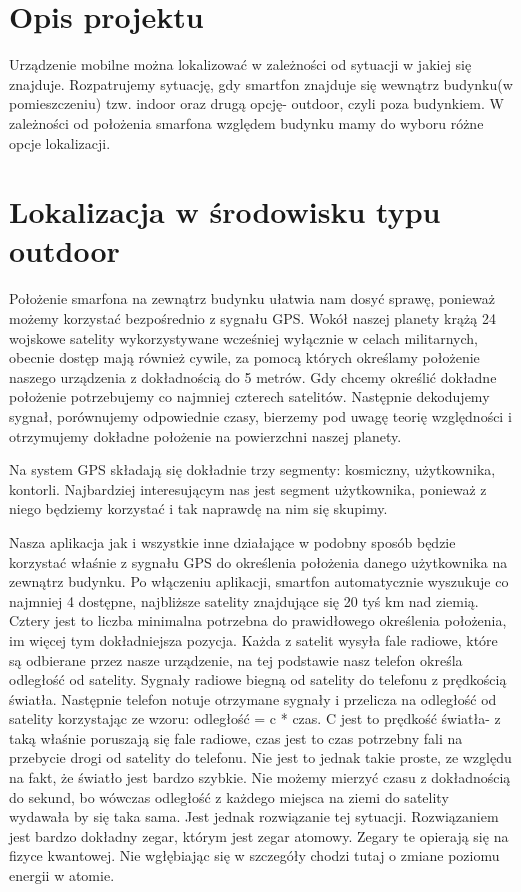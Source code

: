 \documentclass[11pt]{article}
\begin{document}
	\tableofcontents
	\cleardoublepage
	\setcounter{page}{2}
	
		\section{Opis projektu}
		
		
		
		Urządzenie mobilne można lokalizować w zależności od sytuacji w jakiej się znajduje. Rozpatrujemy sytuację, gdy smartfon znajduje się wewnątrz budynku(w pomieszczeniu) tzw. indoor oraz drugą opcję- outdoor, czyli poza budynkiem. W zależności od położenia smarfona względem budynku mamy do wyboru różne opcje lokalizacji.
		
		\section{Lokalizacja w środowisku typu outdoor}
		
		Położenie smarfona na zewnątrz budynku ułatwia nam dosyć sprawę, ponieważ możemy korzystać bezpośrednio z sygnału GPS. Wokół naszej planety krążą 24 wojskowe satelity wykorzystywane wcześniej wyłącznie w celach militarnych, obecnie dostęp mają również cywile, za pomocą których określamy położenie naszego urządzenia z dokładnością do 5 metrów. Gdy chcemy określić dokładne położenie potrzebujemy co najmniej czterech satelitów. Następnie dekodujemy sygnał, porównujemy odpowiednie czasy, bierzemy pod uwagę teorię względności i otrzymujemy dokładne położenie na powierzchni naszej planety. 
		
		Na system GPS składają się dokładnie trzy segmenty: kosmiczny, użytkownika, kontorli. Najbardziej interesującym nas jest segment użytkownika, ponieważ z niego będziemy korzystać i tak naprawdę na nim się skupimy.
		
		Nasza aplikacja jak i wszystkie inne działające w podobny sposób będzie korzystać właśnie z sygnału GPS do określenia położenia danego użytkownika na zewnątrz budynku. Po włączeniu aplikacji, smartfon automatycznie wyszukuje co najmniej 4 dostępne, najbliższe satelity znajdujące się 20 tyś km nad ziemią. Cztery jest to liczba minimalna potrzebna do prawidłowego określenia położenia, im więcej tym dokładniejsza pozycja. Każda z satelit wysyła fale radiowe, które są odbierane przez nasze urządzenie, na tej podstawie nasz telefon określa odległość od satelity. Sygnały radiowe biegną od satelity do telefonu z prędkością światła. Następnie telefon notuje otrzymane sygnały i przelicza na odległość od satelity korzystając ze wzoru: odległość = c * czas. C jest to prędkość światła- z taką właśnie poruszają się fale radiowe, czas jest to czas potrzebny fali na przebycie drogi od satelity do telefonu. Nie jest to jednak takie proste, ze względu na fakt, że światło jest bardzo szybkie. Nie możemy mierzyć czasu z dokładnością do sekund, bo wówczas odległość z każdego miejsca na ziemi do satelity wydawała by się taka sama. Jest jednak rozwiązanie tej sytuacji. Rozwiązaniem jest bardzo dokładny zegar, którym jest zegar atomowy. Zegary te opierają się na fizyce kwantowej. Nie wgłębiając się w szczegóły chodzi tutaj o zmiane poziomu energii w atomie.
		
\end{document}
